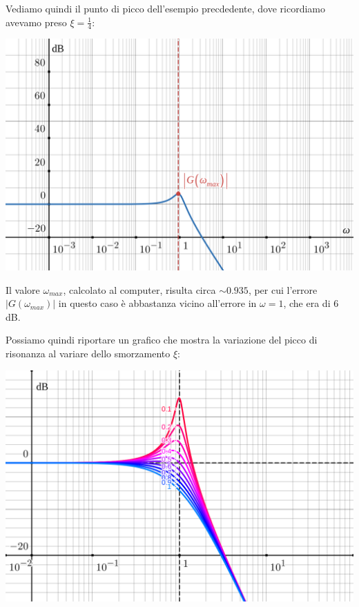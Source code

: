 \documentclass[a4paper,11pt]{article}
\begin{document}
\par\medskip

\noindent
\begin{minipage}{\textwidth}
Vediamo quindi il punto di picco dell'esempio precdedente, dove ricordiamo avevamo preso $\xi = \frac{1}{4}$:

\begin{center}
	\includegraphics[scale=0.3]{../figures/order2_bode/peak_point.png}
\end{center}
\end{minipage}

\par\medskip

Il valore $\omega_{max}$, calcolato al computer, risulta circa $\sim 0.935$, per cui l'errore $\left| G \left( \omega_{max} \right) \right|$ in questo caso è abbastanza vicino all'errore in $\omega = 1$, che era di 6 dB.

\par\medskip

\noindent
\begin{minipage}{\textwidth}
Possiamo quindi riportare un grafico che mostra la variazione del picco di risonanza al variare dello smorzamento $\xi$:

\begin{center}
	\includegraphics[scale=0.3]{../figures/order2_bode/peak_plot.png}
\end{center}
\end{minipage}
\end{document}
